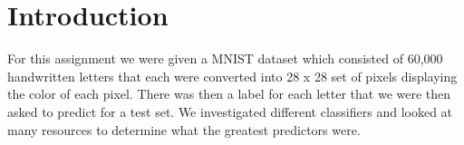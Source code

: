 
\section{Introduction}
\label{sec:intro}

For this assignment we were given a MNIST dataset which consisted of 60,000
handwritten letters that each were converted into 28 x 28 set of
pixels displaying the color of each pixel. There was then a label for
each letter that we were then asked to predict for a test set. We
investigated different classifiers and looked at many resources to
determine what the greatest predictors were. 
\cite{milgram}




